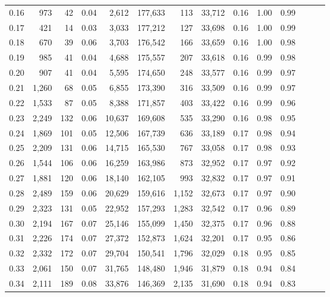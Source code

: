 \begin{tabular}{rrrrrrrrrrrrrr}
0.16 &    973 &     42 &  0.04 &    2,612 &  177,633 &     113 &  33,712 &  0.16 &  1.00 &      0.99 \\
0.17 &    421 &     14 &  0.03 &    3,033 &  177,212 &     127 &  33,698 &  0.16 &  1.00 &      0.99 \\
0.18 &    670 &     39 &  0.06 &    3,703 &  176,542 &     166 &  33,659 &  0.16 &  1.00 &      0.98 \\
0.19 &    985 &     41 &  0.04 &    4,688 &  175,557 &     207 &  33,618 &  0.16 &  0.99 &      0.98 \\
0.20 &    907 &     41 &  0.04 &    5,595 &  174,650 &     248 &  33,577 &  0.16 &  0.99 &      0.97 \\
0.21 &  1,260 &     68 &  0.05 &    6,855 &  173,390 &     316 &  33,509 &  0.16 &  0.99 &      0.97 \\
0.22 &  1,533 &     87 &  0.05 &    8,388 &  171,857 &     403 &  33,422 &  0.16 &  0.99 &      0.96 \\
0.23 &  2,249 &    132 &  0.06 &   10,637 &  169,608 &     535 &  33,290 &  0.16 &  0.98 &      0.95 \\
0.24 &  1,869 &    101 &  0.05 &   12,506 &  167,739 &     636 &  33,189 &  0.17 &  0.98 &      0.94 \\
0.25 &  2,209 &    131 &  0.06 &   14,715 &  165,530 &     767 &  33,058 &  0.17 &  0.98 &      0.93 \\
0.26 &  1,544 &    106 &  0.06 &   16,259 &  163,986 &     873 &  32,952 &  0.17 &  0.97 &      0.92 \\
0.27 &  1,881 &    120 &  0.06 &   18,140 &  162,105 &     993 &  32,832 &  0.17 &  0.97 &      0.91 \\
0.28 &  2,489 &    159 &  0.06 &   20,629 &  159,616 &   1,152 &  32,673 &  0.17 &  0.97 &      0.90 \\
0.29 &  2,323 &    131 &  0.05 &   22,952 &  157,293 &   1,283 &  32,542 &  0.17 &  0.96 &      0.89 \\
0.30 &  2,194 &    167 &  0.07 &   25,146 &  155,099 &   1,450 &  32,375 &  0.17 &  0.96 &      0.88 \\
0.31 &  2,226 &    174 &  0.07 &   27,372 &  152,873 &   1,624 &  32,201 &  0.17 &  0.95 &      0.86 \\
0.32 &  2,332 &    172 &  0.07 &   29,704 &  150,541 &   1,796 &  32,029 &  0.18 &  0.95 &      0.85 \\
0.33 &  2,061 &    150 &  0.07 &   31,765 &  148,480 &   1,946 &  31,879 &  0.18 &  0.94 &      0.84 \\
0.34 &  2,111 &    189 &  0.08 &   33,876 &  146,369 &   2,135 &  31,690 &  0.18 &  0.94 &      0.83 \\

\end{tabular}
